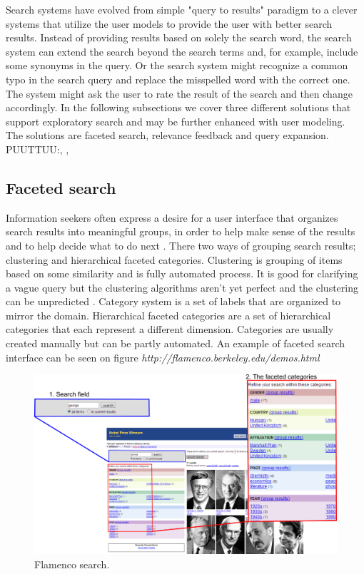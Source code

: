 \documentclass{sigchi}
\begin{document}
Search systems have evolved from simple "query to results" paradigm to a clever systems that utilize the user models to provide the user with better search results. Instead of providing results based on solely the search word, the search system can extend the search beyond the search terms and, for example, include some synonyms in the query. Or the search system might recognize a common typo in the search query and replace the misspelled word with the correct one. The system might ask the user to rate the result of the search and then change accordingly. In the following subsections we cover three different solutions that support exploratory search and may be further enhanced with user modeling. The solutions are faceted search, relevance feedback and query expansion.
PUUTTUU:\cite{bunt04}, \cite{findlater04}, \cite{brusi96}

\subsection{Faceted search}

Information seekers often express a desire for a user interface that organizes search results into meaningful groups, in order to help make sense of the results and to help decide what to do next \cite{hearst06}. There two ways of grouping search results; clustering and hierarchical faceted categories. Clustering is grouping of items based on some similarity and is fully automated process. It is good for clarifying a vague query but the clustering algorithms aren't yet perfect and the clustering can be unpredicted \cite{hearst06}. Category system is a set of labels that are organized to mirror the domain. Hierarchical faceted categories are a set of hierarchical categories that each represent a different dimension. Categories are usually created manually but can be partly automated. An example of faceted search interface can be seen on figure \textit{http://flamenco.berkeley.edu/demos.html}

\begin{figure}[htp] %
\caption{ Flamenco search.} \label{flamenco}
\vspace{5pt}
\includegraphics[scale=0.18]{figures/flamenco.pdf} 

\end{figure}
\end{document}

